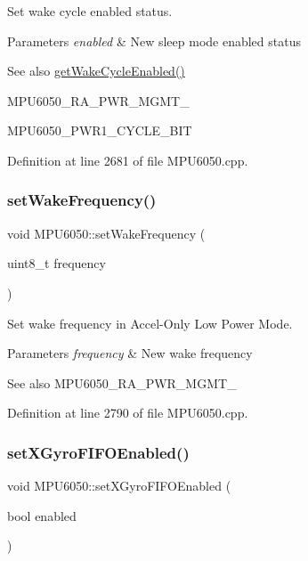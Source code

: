 Set wake cycle enabled status. 


\begin{DoxyParams}{Parameters}
{\em enabled} & New sleep mode enabled status \\
\hline
\end{DoxyParams}
\begin{DoxySeeAlso}{See also}
\mbox{\hyperlink{classMPU6050_a89afc5235b9088c696e2cc7841f5259a}{get\+Wake\+Cycle\+Enabled()}} 

M\+P\+U6050\+\_\+\+R\+A\+\_\+\+P\+W\+R\+\_\+\+M\+G\+M\+T\+\_ 

M\+P\+U6050\+\_\+\+P\+W\+R1\+\_\+\+C\+Y\+C\+L\+E\+\_\+\+B\+IT 
\end{DoxySeeAlso}


Definition at line 2681 of file M\+P\+U6050.\+cpp.

\mbox{\label{classMPU6050_a62495e89f4787e6b18f0f795cef2b7cd}} 
\subsubsection{\texorpdfstring{setWakeFrequency()}{setWakeFrequency()}}
{\footnotesize\ttfamily void M\+P\+U6050\+::set\+Wake\+Frequency (\begin{DoxyParamCaption}\item[{uint8\+\_\+t}]{frequency }\end{DoxyParamCaption})}



Set wake frequency in Accel-\/\+Only Low Power Mode. 


\begin{DoxyParams}{Parameters}
{\em frequency} & New wake frequency \\
\hline
\end{DoxyParams}
\begin{DoxySeeAlso}{See also}
M\+P\+U6050\+\_\+\+R\+A\+\_\+\+P\+W\+R\+\_\+\+M\+G\+M\+T\+\_ 
\end{DoxySeeAlso}


Definition at line 2790 of file M\+P\+U6050.\+cpp.

\mbox{\label{classMPU6050_a53a03d1f255a62f01375c870cdc85767}} 
\subsubsection{\texorpdfstring{setXGyroFIFOEnabled()}{setXGyroFIFOEnabled()}}
{\footnotesize\ttfamily void M\+P\+U6050\+::set\+X\+Gyro\+F\+I\+F\+O\+Enabled (\begin{DoxyParamCaption}\item[{bool}]{enabled }\end{DoxyParamCaption})}



